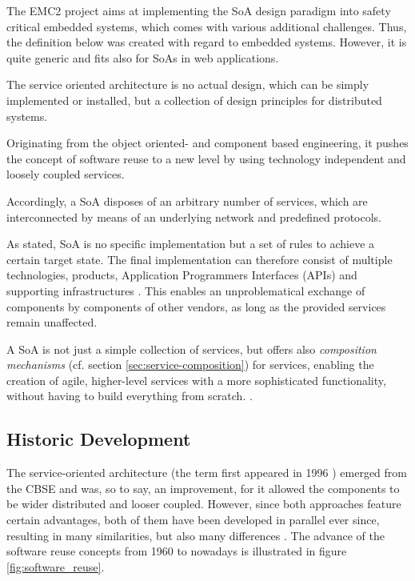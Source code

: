 The EMC2 project aims at implementing the SoA design paradigm into safety critical embedded systems, which comes with various additional challenges. Thus, the definition below was created with regard to embedded systems. However, it is quite generic and fits also for SoAs in web applications.

\begin{myquote}
	The service oriented architecture is no actual design, which can be simply implemented or installed, but a collection of design principles for distributed systems.

	Originating from the object oriented- and component based engineering, it pushes the concept of software reuse to a new level by using technology independent and loosely coupled services.

	Accordingly, a SoA disposes of an arbitrary number of services, which are interconnected by means of an underlying network and predefined protocols.
\end{myquote}

As stated, SoA is no specific implementation but a set of rules to achieve a certain target state. The final implementation can therefore consist of multiple technologies, products, Application Programmers Interfaces (APIs) and supporting infrastructures \cite[p.29]{erl2011}. This enables an unproblematical exchange of components by components of other vendors, as long as the provided services remain unaffected.

A SoA is not just a simple collection of services, but offers also \emph{composition mechanisms} (cf. section \ref{sec:service-composition}) for services, enabling the creation of agile, higher-level services with a more sophisticated functionality, without having to build everything from scratch. \cite[p.12]{josuttis}.



\subsection{Historic Development}
The service-oriented architecture (the term first appeared in 1996 \cite[p.7]{rosen}) emerged from the CBSE and was, so to say, an improvement, for it allowed the components to be wider distributed and looser coupled. However, since both approaches feature certain advantages, both of them have been developed in parallel ever since, resulting in many similarities, but also many differences \cite{breivold}. The advance of the software reuse concepts from 1960 to nowadays is illustrated in figure \ref{fig:software_reuse}.




